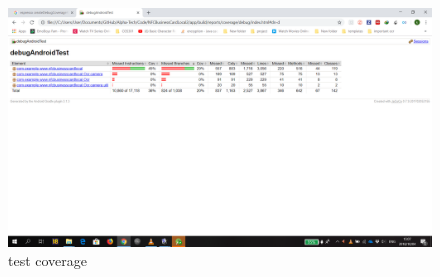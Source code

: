 \documentclass[english]{article}
\begin{document}
\begin{figure}
				\centering
			\includegraphics[scale=0.3]{coverage.png}
				\caption{test coverage}
				\label{figure: 2}
			\end{figure}
	
	
		
\end{document}
